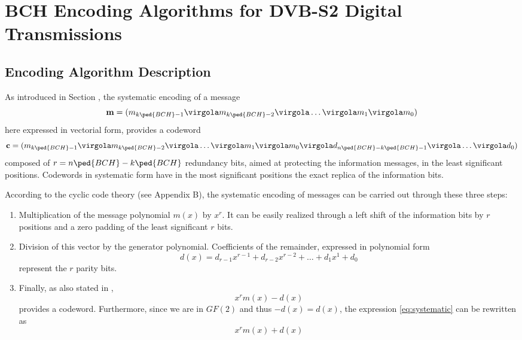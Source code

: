 

\chapter{BCH Encoding Algorithms for DVB-S2 Digital Transmissions} \label{ch:BCHAlg&Arch}


\section{Encoding Algorithm Description}

As introduced in Section , the systematic encoding of a message
\begin{equation}
 \vet m = (m_{k\ped{BCH}-1} \virgola m_{k\ped{BCH}-2} \virgola \ldots  \virgola m_{1} \virgola m_{0})
\end{equation}
here expressed in vectorial form, provides a codeword
\begin{equation}
\vet c = (m_{k\ped{BCH}-1} \virgola m_{k\ped{BCH}-2} \virgola \ldots  \virgola m_{1} \virgola m_{0} \virgola d_{n\ped{BCH}-k\ped{BCH}-1} \virgola \ldots \virgola d_0)
\end{equation} \label{eq:codsyst}
composed of \(r=n\ped{BCH}-k\ped{BCH}\) redundancy bits, aimed at protecting the information messages, in the least significant positions. Codewords in systematic form have in the most significant positions the exact replica of the information bits.

According to the cyclic code theory (see Appendix B), the systematic encoding of messages can be carried out through these three steps:
\begin{enumerate}
\item Multiplication of the message polynomial $m(x)$ by $x^r$. It can be easily realized through a left shift of the information bits by $r$ positions and a zero padding of the least significant $r$ bits.
\item Division of this vector by the generator polynomial. Coefficients of the remainder, expressed in polynomial form
    \begin{equation}
    d(x) = d_{r-1}x^{r-1} +  d_{r-2}x^{r-2} + \ldots+ d_1 x^1 + d_0 \label{eq:remainder}
    \end{equation}
    represent the \(r\) parity bits.
\item Finally, as also stated in ,
\begin{equation} \label{eq:systematic}
 x^{r}m(x)-d(x)
\end{equation}
provides a codeword. Furthermore, since we are in $GF(2)$ and thus $-d(x) = d(x)$, the expression \eqref{eq:systematic} can be rewritten as
\begin{equation}
 x^{r}m(x)+d(x) \label{eq:sistematica}
\end{equation}
\end{enumerate}

